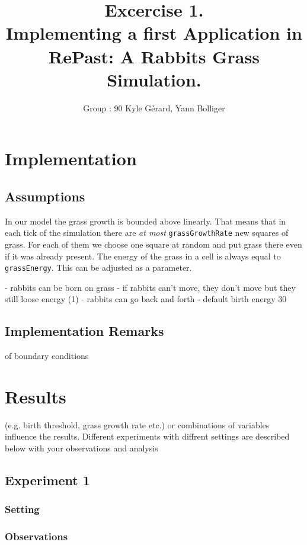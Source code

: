 \documentclass[11pt]{article}
\title{\bf Excercise 1.\\ Implementing a first Application in RePast: A Rabbits Grass Simulation.}
\author{Group \textnumero: 90  Kyle Gérard, Yann Bolliger}
\begin{document}
\maketitle

\section{Implementation}

\subsection{Assumptions}
In our model the grass growth is bounded above linearly. 
That means that in each tick of the simulation there are \textit{at most} \texttt{grassGrowthRate} 
new squares of grass. For each of them we choose one square at random and put grass there even 
if it was already present. The energy of the grass in a cell is always equal to 
\texttt{grassEnergy}. This can be adjusted as a parameter.
 
 - rabbits can be born on grass
 - if rabbits can't move, they don't move but they still loose energy (1)
 - rabbits can go back and forth
 - default birth energy 30

\subsection{Implementation Remarks}
of boundary conditions %

\section{Results}
(e.g. birth threshold, grass growth rate etc.) or combinations of variables
influence the results. Different experiments with diffrent settings are
described below with your observations and analysis

\subsection{Experiment 1}

\subsubsection{Setting}

\subsubsection{Observations}
\end{document}

